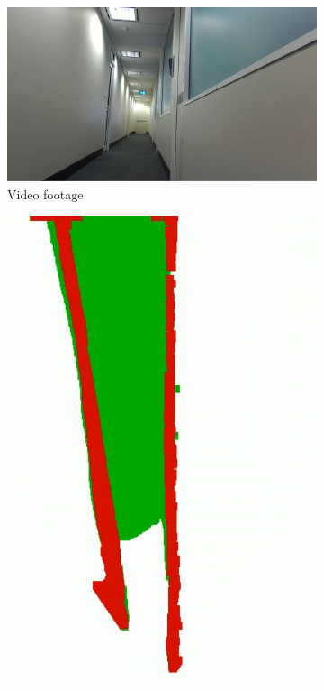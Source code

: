 \begin{figure}[p]
    \centering
    \begin{subfigure}{.5\textwidth}
        \centering
        \includegraphics[width=\linewidth]{images/vfh_fov_video.PNG}
        \caption{Video footage}
    \end{subfigure}
    \quad
    \begin{subfigure}{.2\textwidth}
        \centering
        \includegraphics[width=\linewidth,frame]{images/vfh_fov_map.PNG}

\end{subfigure}
\end{figure}
